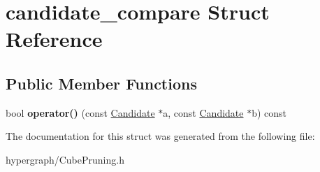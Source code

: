 \hypertarget{structcandidate__compare}{
\section{candidate\_\-compare Struct Reference}
\label{structcandidate__compare}
}
\subsection*{Public Member Functions}
\begin{DoxyCompactItemize}
\item 
\hypertarget{structcandidate__compare_ad142d42876f8dd88301ee5f1b3aed03b}{
bool {\bfseries operator()} (const \hyperlink{structCandidate}{Candidate} $\ast$a, const \hyperlink{structCandidate}{Candidate} $\ast$b) const }
\label{structcandidate__compare_ad142d42876f8dd88301ee5f1b3aed03b}

\end{DoxyCompactItemize}


The documentation for this struct was generated from the following file:\begin{DoxyCompactItemize}
\item 
hypergraph/CubePruning.h\end{DoxyCompactItemize}
